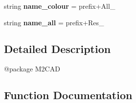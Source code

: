 \begin{DoxyCompactItemize}
\item 
\hypertarget{namespace_m2_c_a_d_1_1colour__subtraction_afeeeb7b03a2fdce8b760fc01e0fdd830}{}string {\bfseries name\+\_\+colour} = prefix+\textquotesingle{}All\+\_\+\textquotesingle{}\label{namespace_m2_c_a_d_1_1colour__subtraction_afeeeb7b03a2fdce8b760fc01e0fdd830}

\item 
\hypertarget{namespace_m2_c_a_d_1_1colour__subtraction_aabe389ac589e91f9708fcf6bcb478d81}{}string {\bfseries name\+\_\+all} = prefix+\textquotesingle{}Res\+\_\+\textquotesingle{}\label{namespace_m2_c_a_d_1_1colour__subtraction_aabe389ac589e91f9708fcf6bcb478d81}

\end{DoxyCompactItemize}


\subsection{Detailed Description}
\begin{DoxyVerb}@package M2CAD\end{DoxyVerb}
 

\subsection{Function Documentation}
\hypertarget{namespace_m2_c_a_d_1_1colour__subtraction_a5245941117b7e24995d94ef5dd58489a}{}
